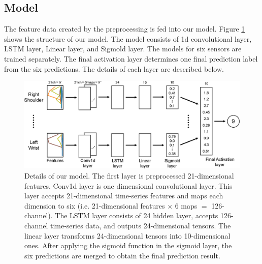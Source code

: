 \documentclass[graybox]{svmult}
\begin{document}
\subsection{Model}
\label{subsec:model}
The feature data created by the preprocessing is fed into our model. Figure \ref{fig:model} shows the structure of our model. The model consists of 1d convolutional layer, LSTM layer, Linear layer, and Sigmold layer. The models for six sensors are trained separately. The final activation layer determines one final prediction label from the six predictions. The details of each layer are described below.

\begin{figure}[h]
    \centering
    \includegraphics[width=0.9\linewidth]{figures/model.eps}
    \caption{Details of our model. The first layer is preprocessed 21-dimensional features. Conv1d layer is one dimensional convolutional layer. This layer accepts 21-dimensional time-series features and maps each dimension to six (i.e. 21-dimensional features $\times$ 6 maps $=$ 126-channel). The LSTM layer consists of 24 hidden layer, accepts 126-channel time-series data, and outputs 24-dimensional tensors. The linear layer transforms 24-dimensional tensors into 10-dimensional ones. After applying the sigmoid function in the sigmoid layer, the six predictions are merged to obtain the final prediction result.}
    \label{fig:model}
\end{figure}
\end{document}
